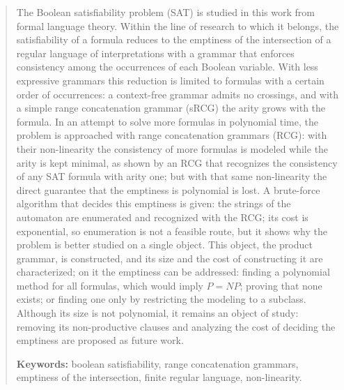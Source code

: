 \begin{abstract}

The Boolean satisfiability problem (SAT) is studied in this work from
formal language theory. Within the line of research to which it belongs,
the satisfiability of a formula reduces to the emptiness of the
intersection of a regular language of interpretations with a grammar that
enforces consistency among the occurrences of each Boolean variable. With
less expressive grammars this reduction is limited to formulas with a
certain order of occurrences: a context-free grammar admits no crossings,
and with a simple range concatenation grammar (sRCG) the arity grows with
the formula. In an attempt to solve more formulas in polynomial time, the
problem is approached with range concatenation grammars (RCG): with their
non-linearity the consistency of more formulas is modeled while the arity
is kept minimal, as shown by an RCG that recognizes the consistency of
any SAT formula with arity one; but with that same non-linearity the
direct guarantee that the emptiness is polynomial is lost. A brute-force
algorithm that decides this emptiness is given: the strings of the
automaton are enumerated and recognized with the RCG; its cost is
exponential, so enumeration is not a feasible route, but it shows why the
problem is better studied on a single object. This object, the product
grammar, is constructed, and its size and the cost of constructing it are
characterized; on it the emptiness can be addressed: finding a polynomial
method for all formulas, which would imply $P = NP$; proving that none
exists; or finding one only by restricting the modeling to a subclass.
Although its size is not polynomial, it remains an object of study:
removing its non-productive clauses and analyzing the cost of deciding
the emptiness are proposed as future work.

\vspace{1em}
\noindent\textbf{Keywords:} boolean satisfiability, range concatenation
grammars, emptiness of the intersection, finite regular language,
non-linearity.

\end{abstract}

